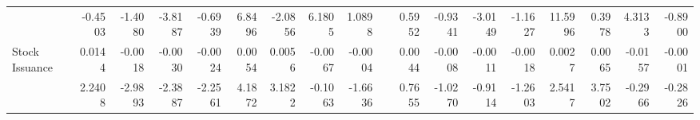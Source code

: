 \begin{sidewaystable}[htbp]
{\begin{tabular}{lrrrrrrrrrrrrrrrrr}
& -0.4503 & -1.4080 & -3.8187 & -0.6939 & 6.8496 & -2.0856 & 6.1805 & 1.0898 &       & 0.5952 & -0.9341 & -3.0149 & -1.1627 & 11.5996 & 0.3978 & 4.3133 & -0.8900 \\
Stock Issuance & 0.0144 & -0.0018 & -0.0030 & -0.0024 & 0.0054 & 0.0056 & -0.0067 & -0.0004 &       & 0.0044 & -0.0008 & -0.0011 & -0.0018 & 0.0027 & 0.0065 & -0.0157 & -0.0001 \\
& 2.2408 & -2.9893 & -2.3887 & -2.2561 & 4.1872 & 3.1822 & -0.1063 & -1.6636 &       & 0.7655 & -1.0270 & -0.9114 & -1.2603 & 2.5417 & 3.7502 & -0.2966 & -0.2826 \\
\bottomrule
\end{tabular}%
}
\label{tab:epu-ff6v}%
\end{sidewaystable}%
